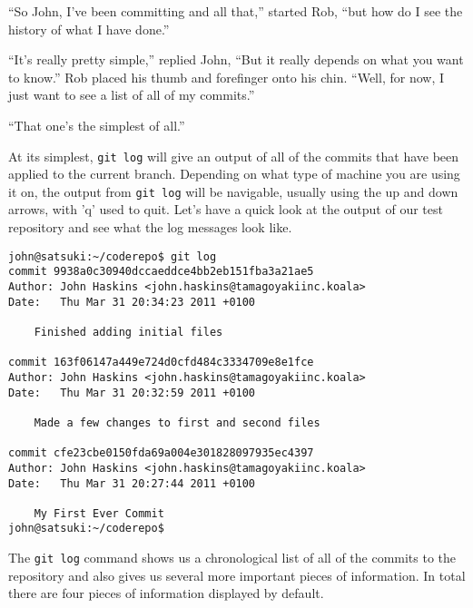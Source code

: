 \begin{trenches}
``So John, I've been committing and all that,'' started Rob, ``but how do I see the history of what I have done.''

``It's really pretty simple,'' replied John, ``But it really depends on what you want to know.''
Rob placed his thumb and forefinger onto his chin.  ``Well, for now, I just want to see a list of all of my commits.''

``That one's the simplest of all.''
\end{trenches}

At its simplest, \texttt{git log} will give an output of all of the commits that have been applied to the current branch.  Depending on what type of machine you are using it on, the output from \texttt{git log} will be navigable, usually using the up and down arrows, with 'q' used to quit.  Let's have a quick look at the output of our test repository and see what the log messages look like.

\begin{Verbatim}
john@satsuki:~/coderepo$ git log
commit 9938a0c30940dccaeddce4bb2eb151fba3a21ae5
Author: John Haskins <john.haskins@tamagoyakiinc.koala>
Date:   Thu Mar 31 20:34:23 2011 +0100

    Finished adding initial files

commit 163f06147a449e724d0cfd484c3334709e8e1fce
Author: John Haskins <john.haskins@tamagoyakiinc.koala>
Date:   Thu Mar 31 20:32:59 2011 +0100

    Made a few changes to first and second files

commit cfe23cbe0150fda69a004e301828097935ec4397
Author: John Haskins <john.haskins@tamagoyakiinc.koala>
Date:   Thu Mar 31 20:27:44 2011 +0100

    My First Ever Commit
john@satsuki:~/coderepo$ 

\end{Verbatim}

The \texttt{git log} command shows us a chronological list of all of the commits to the repository and also gives us several more important pieces of information.  In total there are four pieces of information displayed by default.

